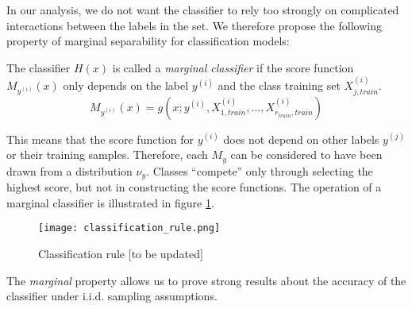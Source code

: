 \documentclass[twoside,11pt]{article}
\begin{document}
In our analysis, we do not
want the classifier to rely too strongly on complicated interactions
between the labels in the set. We therefore propose the following
property of marginal separability for classification models:

\begin{definition}
The classifier $H(x)$ is called a \emph{marginal classifier} if the score 
function $M_{y^{(i)}}(x)$
only depends on the label $y^{(i)}$ and the class training set $X_{j, train}^{(i)}$.
\[M_{y^{(i)}}(x) = g(x; y^{(i)},X_{1, train}^{(i)},...,X_{r_{train}, train}^{(i)})\]
\end{definition}
This means that the score function for $y^{(i)}$ does not depend on other labels $y^{(j)}$ or their training 
samples.  Therefore, each $M_y$ can be considered to have been drawn from a distribution $\nu_y$.
Classes ``compete'' only through selecting the highest score, 
but not in constructing the score functions. 
The operation of a marginal classifier is illustrated in figure
\ref{fig:classification_rule}.


\begin{figure}[h]
\centering
\texttt{[image: classification\_rule.png]}
\caption{Classification rule [to be updated]}\label{fig:classification_rule}
\end{figure}

The \emph{marginal} property allows us to prove
strong results about the accuracy of the classifier under
i.i.d. sampling assumptions.
\end{document}
